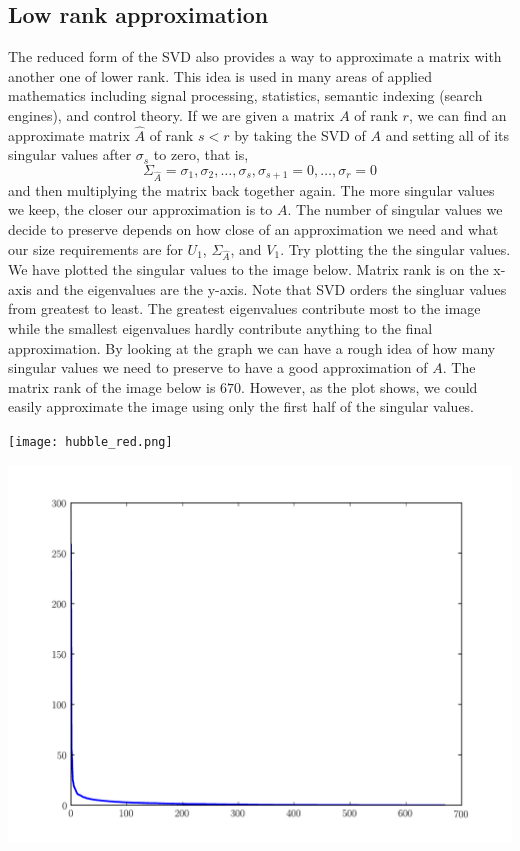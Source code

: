 \subsection*{Low rank approximation}
The reduced form of the SVD also provides a way to approximate a
matrix with another one of lower rank. This idea is used in many areas of applied
mathematics including signal processing, statistics, semantic
indexing (search engines), and control theory.  If we are given a matrix $A$ of rank $r$,
we can find an approximate matrix $\widehat A$ of rank $s<r$ by taking
the SVD of $A$ and setting all of its singular values after
$\sigma_s$ to zero, that is,
\begin{equation*}
\Sigma_{\widehat A} = \sigma_1, \sigma_2, \ldots, \sigma_s,\sigma_{s+1}=0,\ldots,\sigma_r=0
\end{equation*}
and then multiplying the matrix back together again.  The more singular values we keep, the closer our approximation is to $A$.
  The number of singular values we decide to preserve depends on how close of an approximation we need and what our size requirements are for $U_1$, $\Sigma_{\widehat A}$, and $V_1$.
Try plotting the the singular values.  We have plotted the singular values to the image below.  Matrix rank is on the x-axis and the eigenvalues are the y-axis.  Note that SVD orders the singluar values from greatest to least.  The greatest eigenvalues contribute most to the image while the smallest eigenvalues hardly contribute anything to the final approximation.  By looking at the graph we can have a rough idea of how many singular values we need to preserve to have a good approximation of $A$.  The matrix rank of the image below is $670$.  However, as the plot shows, we could easily approximate the image using only the first half of the singular values.

\begin{center}
\texttt{[image: hubble\_red.png]}

\includegraphics[scale=.4]{hubble_svals.pdf}
\end{center}

